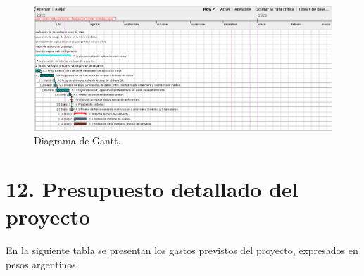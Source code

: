 \documentclass[
11pt, %
]{charter}
\begin{document}
\newpage
\begin{landscape}
\begin{figure}[htpb]
\centering 
\includegraphics[height=.60\textheight]{./Figuras/planning3.png}
\caption{Diagrama de Gantt.}
\label{fig:diagGantt3}
\end{figure}

\end{landscape}

\section{12. Presupuesto detallado del proyecto}
\label{sec:presupuesto}




En la siguiente tabla se presentan los gastos previstos del proyecto, expresados en pesos argentinos.
\end{document}
